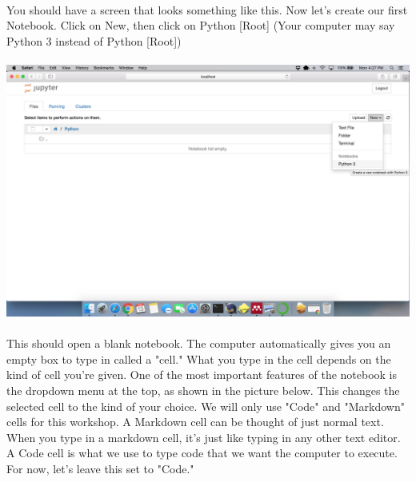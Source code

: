 \documentclass[]{article}
\begin{document}
\paragraph{}
You should have a screen that looks something like this. Now let's create our first Notebook. Click on New, then click on Python [Root] (Your computer may say Python 3 instead of Python [Root])
\paragraph{}
\begin{centering}
    \centerline{\includegraphics[scale=0.25]{Screenshot_20.png}}
\end{centering}

\clearpage
\paragraph{}
This should open a blank notebook. The computer automatically gives you an empty box to type in called a "cell." What you type in the cell depends on the kind of cell you're given. One of the most important features of the notebook is the dropdown menu at the top, as shown in the picture below. This changes the selected cell to the kind of your choice. We will only use "Code" and "Markdown" cells for this workshop. A Markdown cell can be thought of just normal text. When you type in a markdown cell, it's just like typing in any other text editor. A Code cell is what we use to type code that we want the computer to execute. For now, let's leave this set to "Code."
\end{document}
